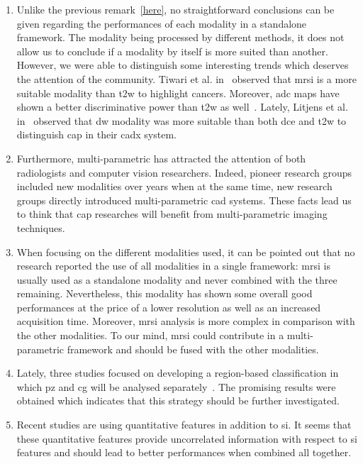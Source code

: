 \begin{enumerate}
\item Unlike the previous remark~\ref{here}, no straightforward conclusions can be given regarding the performances of each modality in a standalone framework.
The modality being processed by different methods, it does not allow us to conclude if a modality by itself is more suited than another.
However, we were able to distinguish some interesting trends which deserves the attention of the community.
Tiwari et al. in~\cite{Tiwari2009a,Tiwari2012,Tiwari2013} observed that \ac{mrsi} is a more suitable modality than \ac{t2w} to highlight cancers.
Moreover, \ac{adc} maps have shown a better discriminative power than \ac{t2w} as well~\cite{Langer2009,Viswanath2011,Peng2013}.
Lately, Litjens et al. in~\cite{Litjens2014} observed that \ac{dw} modality was more suitable than both \ac{dce} and \ac{t2w} to distinguish \ac{cap} in their \ac{cadx} system. 

\item Furthermore, multi-parametric has attracted the attention of both radiologists and computer vision researchers.
Indeed, pioneer research groups included new modalities over years when at the same time, new research groups directly introduced multi-parametric \ac{cad} systems.
These facts lead us to think that \ac{cap} researches will benefit from multi-parametric imaging techniques.

\item When focusing on the different modalities used, it can be pointed out that no research reported the use of all modalities in a single framework: \ac{mrsi} is usually used as a standalone modality and never combined with the three remaining.
Nevertheless, this modality has shown some overall good performances at the price of a lower resolution as well as an increased acquisition time.
Moreover, \ac{mrsi} analysis is more complex in comparison with the other modalities.
To our mind, \ac{mrsi} could contribute in a multi-parametric framework and should be fused with the other modalities.

\item Lately, three studies focused on developing a region-based classification in which \ac{pz} and \ac{cg} will be analysed separately~\cite{Viswanath2012,Litjens2012,Litjens2014}.
The promising results were obtained which indicates that this strategy should be further investigated.

\item Recent studies are using quantitative features in addition to \ac{si}.
It seems that these quantitative features provide uncorrelated information with respect to \ac{si} features and should lead to better performances when combined all together. 


\end{enumerate}
